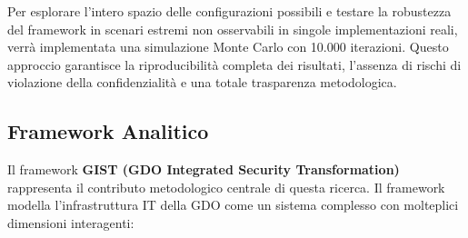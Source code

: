 Per esplorare l'intero spazio delle configurazioni possibili e testare la robustezza del framework in scenari estremi non osservabili in singole implementazioni reali, verrà implementata una simulazione Monte Carlo con 10.000 iterazioni. Questo approccio garantisce la riproducibilità completa dei risultati, l'assenza di rischi di violazione della confidenzialità e una totale trasparenza metodologica.
\subsection{\texorpdfstring{\textbf{Framework
Analitico}}{1.5.2 Framework Analitico}}\label{framework-analitico}

Il framework \textbf{GIST (GDO Integrated Security Transformation)} rappresenta il contributo metodologico centrale di questa ricerca. 
Il framework modella l'infrastruttura IT della GDO come un sistema complesso con molteplici dimensioni interagenti:

